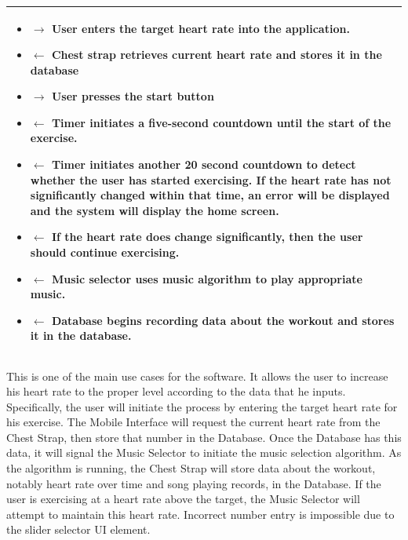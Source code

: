 \documentclass[letterpaper,english, 12pt]{scrreprt}
\begin{document}
\begin{center}
\begin{tabular}{|C{15cm}|}
                                \begin{itemize}
                                        \item $\rightarrow$ User enters the target heart rate into the application.
					\item $\leftarrow$ Chest strap retrieves current heart rate and stores it in the database
					\item $\rightarrow$ User presses the start button
                                        \item $\leftarrow$ Timer initiates a five-second countdown until the start of the exercise.
					\item $\leftarrow$ Timer initiates another 20 second countdown to detect whether the user has started exercising. If the heart rate has not significantly changed within that time, an error will be displayed and the system will display the home screen. 
                                        \item $\leftarrow$ If the heart rate does change significantly, then the user should continue exercising.
                                        \item $\leftarrow$ Music selector uses music algorithm to play appropriate music.
                                        \item $\leftarrow$ Database begins recording data about the workout and stores it in the database.
                                \end{itemize}
				\\
               	\hline
        \end{tabular}
\end{center}

This is one of the main use cases for the software. It allows the user to increase his heart rate to the proper level according to the data that he inputs. Specifically, the user will initiate the process by entering the target heart rate for his exercise. The Mobile Interface will request the current heart rate from the Chest Strap, then store that number in the Database. Once the Database has this data, it will signal the Music Selector to initiate the music selection algorithm. As the algorithm is running, the Chest Strap will store data about the workout, notably heart rate over time and song playing records, in the Database. If the user is exercising at a heart rate above the target, the Music Selector will attempt to maintain this heart rate. Incorrect number entry is impossible due to the slider selector UI element.\\
\end{document}
